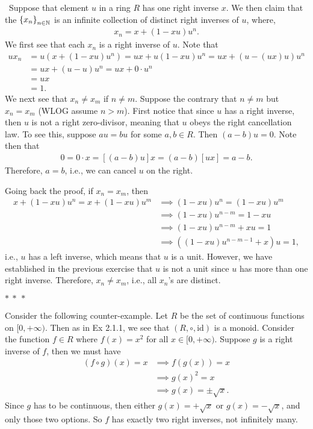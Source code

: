 \documentclass[12pt]{article}
\begin{document}
\begin{fproof}[Jacobson 2.2.7]\
  Suppose that element \(u\) in a ring \(R\) has one right inverse \(x\).
  We then claim that the \(\left\{ x_n \right\}_{n \in \mathbb{N}}\) is an infinite collection of distinct right inverses of \(u\), where,
  \begin{align*}
    x_n = x + (1-xu)u^n.
  \end{align*}
  We first see that each \(x_n\) is a right inverse of \(u\). Note that
  \begin{align*}
    ux_n & = u(x + (1-xu)u^n) = ux + u(1-xu)u^n = ux + (u - (ux)u)u^n \\
    & = ux + (u-u)u^n = ux + 0 \cdot u^n\\
    & = ux \\
    & = 1.
  \end{align*}
  We next see that \(x_n \neq x_m\) if \(n \neq m\).
  Suppose the contrary that \(n \neq m\) but \(x_n = x_m\) (WLOG assume \(n > m\)).
  First notice that since \(u\) has a right inverse, then \(u\) is not a right zero-divisor, meaning that \(u\) obeys the right cancellation law.
  To see this, suppose \(au = bu\) for some \(a,b \in R\).
  Then \((a-b)u = 0\).
  Note then that
  \begin{align*}
    0 = 0 \cdot x = [(a-b)u]x = (a-b)[ux] = a-b.
  \end{align*}
  Therefore, \(a=b\), i.e., we can cancel \(u\) on the right.

  Going back the proof, if \(x_n = x_m\), then
  \begin{align*}
    x + (1-xu)u^n = x + (1-xu)u^m 
    &\implies (1-xu)u^n = (1-xu)u^m \\
    &\implies (1-xu)u^{n-m} = 1-xu \tag{cancel \(u\) on the right}\\
    & \implies (1-xu)u^{n-m} + xu = 1\\
    & \implies ((1-xu)u^{n-m-1} + x)u = 1,
  \end{align*}
  i.e., \(u\) has a left inverse, which means that \(u\) is a unit.
  However, we have established in the previous exercise that \(u\) is not a unit since \(u\) has more than one right inverse.
  Therefore, \(x_n \neq x_m\), i.e., all \(x_n\)'s are distinct.
  \begin{center}
    \(\ast~\ast~\ast\)
  \end{center}
  Consider the following counter-example.
  Let \(R\) be the set of continuous functions on \([0, + \infty)\).
  Then as in Ex 2.1.1, we see that \((R, \circ, \text{id})\) is a monoid.
  Consider the function \(f \in R\) where \(f(x) = x^2\) for all \(x \in [0,+\infty)\).
  Suppose \(g\) is a right inverse of \(f\), then we must have
  \begin{align*}
    (f \circ g)(x) = x &\implies f(g(x)) = x \\
    & \implies g(x)^2 = x\\
    & \implies g(x) = \pm \sqrt{x}.
  \end{align*}
  Since \(g\) has to be continuous, then either \(g(x) = + \sqrt{x}\) or \(g(x) = - \sqrt{x}\), and only those two options. So \(f\) has exactly two right inverses, not infinitely many.
\end{fproof}
\end{document}
